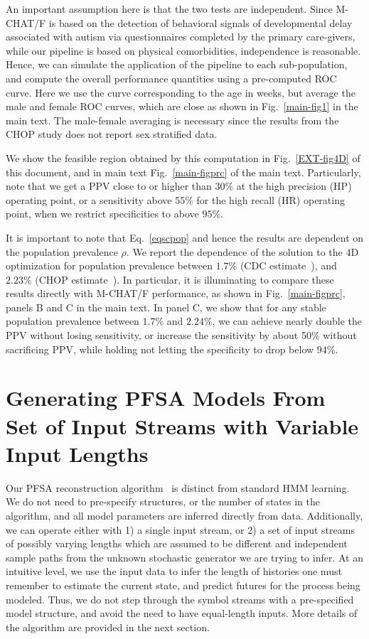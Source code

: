 \documentclass[onecolumn,,10pt]{IEEEtran}
\begin{document}
An important assumption here is that the two tests are independent. Since M-CHAT/F is based on the detection of behavioral signals of developmental delay associated with autism via questionnaires completed by the primary care-givers, while our pipeline is based on  physical comorbidities, independence is reasonable. Hence, we can simulate the application of the pipeline to each sub-population, and compute the overall performance quantities using a pre-computed ROC curve. Here we use the curve corresponding to the age in weeks, but average the male and female ROC curves, which are  close as shown in Fig.~\ref{main-fig1} in the main text. The male-female averaging is necessary since the results from the CHOP study does not report sex stratified data.
 
We show the feasible region obtained by this computation in Fig.~\ref{EXT-fig4D} of this document, and in main text Fig.~\ref{main-figprc} of the main text. Particularly, note that we get a PPV close to or higher than $30\%$ at the high precision (HP) operating point, or a sensitivity above  55\% for the high recall (HR) operating point, when we restrict specificities to above $95\%$.
  
It is important to note  that Eq.~\eqref{eqscpop} and hence the results are dependent on the population prevalence $\rho$. We report the dependence of the solution to the 4D optimization for population prevalence between $1.7\%$ (CDC estimate~\cite{hyman2020identification}), and $2.23\%$ (CHOP estimate~\cite{pmid31562252}).
In particular, it is illuminating to compare these results directly with M-CHAT/F performance, as shown in Fig.~\ref{main-figprc}, panels B and C in the main text. In panel C, we show that for any stable population prevalence between  
$1.7\%$ and $2.24\%$, we can achieve nearly double the PPV without losing sensitivity, or increase the sensitivity by about 50\% without sacrificing PPV, while holding not letting the  specificity to drop below $94\%$.


\section{Generating PFSA Models From Set of Input Streams with Variable Input Lengths}\label{sec:varl}
Our PFSA reconstruction algorithm~\cite{CL12g} is distinct from standard HMM learning. We do not need to pre-specify structures, or the number of states in the algorithm, and all model parameters are inferred directly from data. Additionally, we can operate either  with 1) a single input stream, or  2) a set of input streams of possibly varying lengths which are assumed to be different and independent sample paths from the unknown stochastic generator we are trying to infer. At an intuitive level, we use the input data to infer the length of histories one must remember to estimate the current state, and predict futures for the process being modeled. Thus, we do not step     through the symbol streams with a pre-specified model structure, and  avoid the need to have equal-length inputs. More details of the algorithm are provided in the next section.
\end{document}
